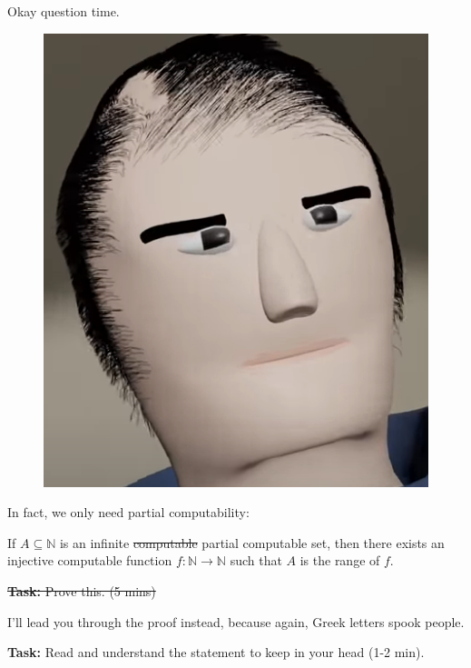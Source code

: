 \documentclass{beamer}
\begin{document}
\begin{frame}{Okay question time.}

\begin{figure}[h]
\centering
\includegraphics[scale=0.2]{img/bench_appearo.png}
\end{figure}

In fact, we only need partial computability:

\vspace{2mm}

If $A \subseteq \mathbb N$ is an infinite \sout{computable} partial computable set, then there exists an injective computable function $f: \mathbb N \to \mathbb N$ such that $A$ is the range of $f$.

\vspace{2mm}

\sout{\textbf{Task:} Prove this. (5 mins)}

I'll lead you through the proof instead, because again, Greek letters spook people.

\textbf{Task:} Read and understand the statement to keep in your head (1-2 min).
\end{frame}
\end{document}
